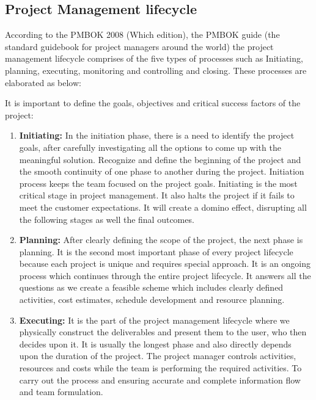 \subsection{Project Management lifecycle}
\label{subsec:subsec01}
According to the PMBOK 2008 (Which edition), the PMBOK guide (the standard guidebook for project managers around the world) the project management lifecycle comprises of the five types of processes such as Initiating, planning, executing, monitoring and controlling and closing. These processes are elaborated as below: 
 
It is important to define the goals, objectives and critical success factors of the project:
\begin{enumerate}
    \item \textbf{Initiating:} In the initiation phase, there is a need to identify the project goals, after carefully investigating all the options to come up with the meaningful solution. Recognize and define the beginning of the project and the smooth continuity of one phase to another during the project. Initiation process keeps the team focused on the project goals. Initiating is the most critical stage in project management. It also halts the project if it fails to meet the customer expectations. It will create a domino effect, disrupting all the following stages as well the final outcomes.

    \item \textbf{Planning:} After clearly defining the scope of the project, the next phase is planning. It is the second most important phase of every project lifecycle because each project is unique and requires special approach. It is an ongoing process which continues through the entire project lifecycle. It answers all the questions as we create a feasible scheme which includes clearly defined activities, cost estimates, schedule development and resource planning.

    \item \textbf{Executing:} It is the part of the project management lifecycle where we physically construct the deliverables and present them to the user, who then decides upon it. It is usually the longest phase and also directly depends upon the duration of the project. The project manager controls activities, resources and costs while the team is performing the required activities. To carry out the process and ensuring accurate and complete information flow and team formulation.


\end{enumerate}
